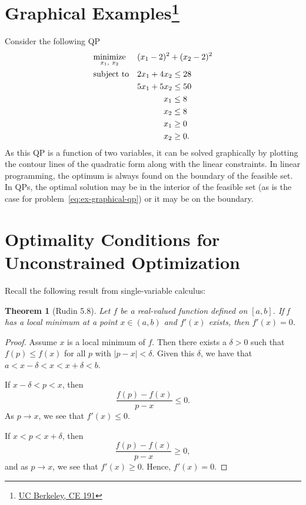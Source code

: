 \documentclass[10pt]{article}
\newtheorem{theorem}{Theorem}
\begin{document}
\section*{Graphical Examples\footnote{\href{https://ecal.berkeley.edu/files/ce191/CH02-QuadraticProgramming.pdf}{UC Berkeley, CE 191}}}
Consider the following QP
\begin{equation}\label{eq:ex-graphical-qp}
\begin{aligned}
& \underset{x_1,\ x_2}{\text{minimize}}
& & (x_1 - 2)^2 + (x_2 - 2)^2 \\
& \text{subject to}
& & 2x_1 + 4x_2 \leq 28 \\
&&& 5x_1 + 5x_2 \leq 50 \\
&&& \hphantom{000{}+{}0} x_1 \leq 8 \\
&&& \hphantom{000{}+{}0} x_2 \leq 8 \\
&&& \hphantom{000{}+{}0} x_1 \geq 0 \\
&&& \hphantom{000{}+{}0} x_2 \geq 0.
\end{aligned}
\end{equation}
As this QP is a function of two variables, it can be solved graphically by plotting the contour lines of the quadratic form along with the linear constraints.
In linear programming, the optimum is always found on the boundary of the feasible set.
In QPs, the optimal solution may be in the interior of the feasible set (as is the case for problem~\eqref{eq:ex-graphical-qp}) or it may be on the boundary.

\section*{Optimality Conditions for Unconstrained Optimization}
Recall the following result from single-variable calculus:
\begin{theorem}[Rudin 5.8]
Let $f$ be a real-valued function defined on $[a, b]$. If f has a local minimum at a point $x\in(a,b)$ and $f'(x)$ exists, then $f'(x)=0$.
\end{theorem}
\begin{proof}
Assume $x$ is a local minimum of $f$.
Then there exists a $\delta>0$ such that $f(p)\leq f(x)$ for all $p$ with $|p-x|<\delta$.
Given this $\delta$, we have that $a < x-\delta < x < x+\delta < b$.

If $x-\delta < p < x$, then
\begin{equation*}
\frac{f(p) - f(x)}{p - x} \leq 0.
\end{equation*}
As $p\to x$, we see that $f'(x)\leq0$.

If $x < p < x+\delta$, then
\begin{equation*}
\frac{f(p) - f(x)}{p - x} \geq 0,
\end{equation*}
and as $p\to x$, we see that $f'(x)\geq0$.
Hence, $f'(x)=0$.
\end{proof}
\end{document}
